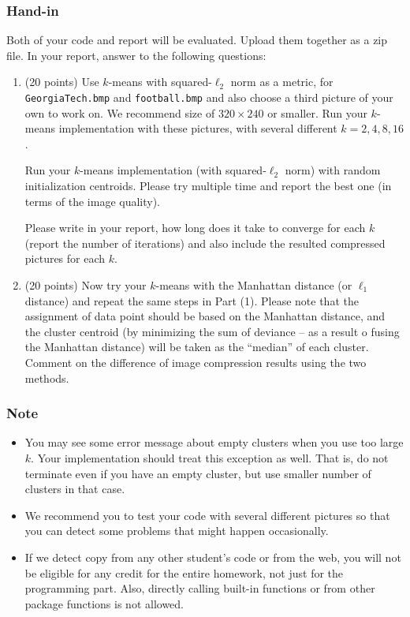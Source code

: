 \documentclass[twoside,10pt]{article}
\begin{document}
\subsubsection*{Hand-in}
Both of your code and report will be evaluated. Upload them together as a zip file. In your report, answer to the following questions:
\begin{enumerate}
  \item (20 points) Use $k$-means with squared-$\ell_2$ norm as a metric, for \texttt{GeorgiaTech.bmp} and \texttt{football.bmp} and also choose a third picture of your own to work on. We recommend size of $320 \times 240$ or smaller. Run your $k$-means implementation with these pictures, with several different $k = 2, 4, 8, 16$. 
  
  
Run your $k$-means implementation (with squared-$\ell_2$ norm) with random initialization centroids. Please try multiple time and report the best one (in terms of the image quality).
  
Please write in your report, how long does it take to converge for each $k$ (report the number of iterations) and also include the resulted compressed pictures for each $k$.
  
\item (20 points) Now try your $k$-means with the Manhattan distance (or $\ell_1$ distance) and repeat the same steps in Part (1). Please note that the assignment of data point should be based on the Manhattan distance, and the cluster centroid (by minimizing the sum of deviance -- as a result o fusing the Manhattan distance) will be taken as the ``median'' of each cluster. Comment on the difference of image compression results using the two methods.
   
\end{enumerate}


\subsubsection*{Note}
\begin{itemize}
  \item You may see some error message about empty clusters when you use too large $k$. Your implementation should treat this exception as well. That is, do not terminate even if you have an empty cluster, but use smaller number of clusters in that case.

  \item   We recommend you to test your code with several different pictures so that you can detect some problems that might happen occasionally. 

  \item If we detect copy from any other student's code or from the web, you will not be eligible for any credit for the entire homework, not just for the programming part. Also, directly calling built-in functions or from other package functions is not allowed.
\end{itemize}
\end{document}
